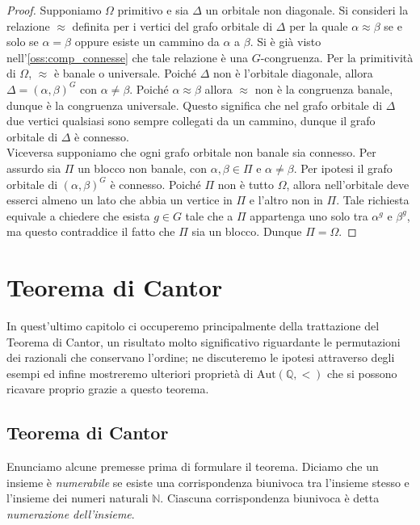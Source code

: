 \documentclass[12pt,a4paper,openright]{report}
\newcommand{\aut}{ \mathrm{Aut} ( \mathbb{Q},< ) } %
\newcommand{\0}{\setminus\{0\}} %
\theoremstyle{definition}
\theoremstyle{plain}
\begin{document}
\begin{proof}
    Supponiamo $\Omega$ primitivo e sia $\Delta$ un orbitale non diagonale. Si consideri la relazione $\approx$ definita per i vertici del grafo orbitale di $\Delta$ per la quale $\alpha \approx \beta$ se e solo se $\alpha=\beta$ oppure esiste un cammino da $\alpha$ a $\beta$. Si è già visto nell'\cref{oss:comp_connesse} che tale relazione è una $G$-congruenza. Per la primitività di $\Omega$, $\approx$ è banale o universale. Poiché $\Delta$ non è l'orbitale diagonale, allora $\Delta=\left(\alpha,\beta\right)^G$ con $\alpha \neq \beta$. Poiché $\alpha \approx \beta$ allora $\approx$ non è la congruenza banale, dunque è la congruenza universale. Questo significa che nel grafo orbitale di $\Delta$ due vertici qualsiasi sono sempre collegati da un cammino, dunque il grafo orbitale di $\Delta$ è connesso.\\
    Viceversa supponiamo che ogni grafo orbitale non banale sia connesso. Per assurdo sia $\Pi$ un blocco non banale, con $\alpha, \beta \in \Pi \mbox{ e } \alpha \neq \beta$. Per ipotesi il grafo orbitale di $(\alpha,\beta)^G$ è connesso. Poiché $\Pi$ non è tutto $\Omega$, allora nell'orbitale deve esserci almeno un lato che abbia un vertice in $\Pi$ e l'altro non in $\Pi$. Tale richiesta equivale a chiedere che esista $g \in G$ tale che a $\Pi$ appartenga uno solo tra $\alpha^g$ e $\beta^g$, ma questo contraddice il fatto che $\Pi$ sia un blocco. Dunque $\Pi=\Omega$.
\end{proof}

\chapter{Teorema di Cantor}

In quest'ultimo capitolo ci occuperemo principalmente della trattazione del Teorema di Cantor, un risultato molto significativo riguardante le permutazioni dei razionali che conservano l'ordine; ne discuteremo le ipotesi attraverso degli esempi ed infine mostreremo ulteriori proprietà di $\aut$ che si possono ricavare proprio grazie a questo teorema.

\section{Teorema di Cantor}
Enunciamo alcune premesse prima di formulare il teorema. Diciamo che un insieme è \emph{numerabile} se esiste una corrispondenza biunivoca tra l'insieme stesso e l'insieme dei numeri naturali $\mathbb{N}$. Ciascuna corrispondenza biunivoca è detta \emph{numerazione dell'insieme}.
\end{document}
